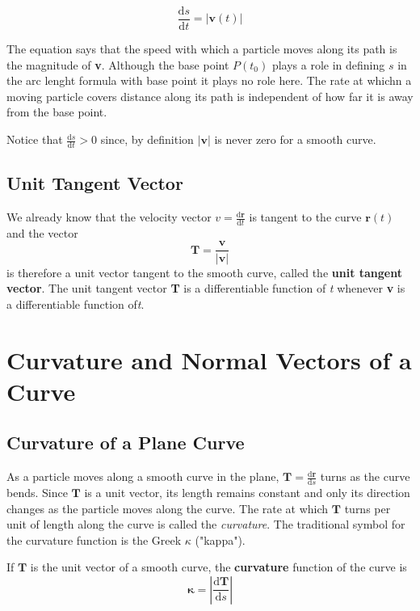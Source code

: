 \documentclass[12pt,a4paper]{article}
\newenvironment{definition}{\begin{definitionbox}}{\end{definitionbox}\vspace{1\baselineskip}}
\newenvironment{mynote}{\vspace{1\baselineskip}\begin{note}}{\end{note}\vspace{1\baselineskip}}
\begin{document}
\begin{mynote}
  \[\frac{\mathrm{d}s}{\mathrm{d}t} = |\mathbf{v}(t)|\]
\end{mynote}

The equation says that the speed with which a particle moves along its path is the magnitude of \textbf{v}. Although the base point $P(t_0)$ plays a role in defining \(s\) in the arc lenght formula with base point it plays no role here. 
The rate at whichn a moving particle covers distance along its path is independent of how far it is away from the base point.

Notice that \(\frac{\mathrm{d}s}{\mathrm{d}t} > 0\) since, by definition \(|\mathbf{v}|\) is never zero for a smooth curve.

\subsection{Unit Tangent Vector}

We already know that the velocity vector \(v = \frac{\mathrm{d}\mathbf{r}}{\mathrm{d}t}\) is tangent to the curve \(\mathbf{r}(t)\) and the vector
\[\mathbf{T} = \frac{\mathbf{v}}{|\mathbf{v}|}\]
is therefore a unit vector tangent to the smooth curve, called the \textbf{unit tangent vector}. The unit tangent vector \textbf{T} is a differentiable function of \textit{t} whenever \textbf{v} is a differentiable function of\textit{t}. 

\newpage

\section{Curvature and Normal Vectors of a Curve}
\subsection{Curvature of a Plane Curve}

As a particle moves along a smooth curve in the plane, $\mathbf{T} = \frac{\mathrm{d}\mathbf{r}}{\mathrm{d}s}$ turns as the curve bends. Since $\mathbf{T}$ is a unit vector, its length remains constant and only its direction changes as the particle moves along the curve. The rate at which $\mathbf{T}$ turns per unit of length along the curve is called the \textit{curvature}. The traditional symbol for the curvature function is the Greek $\kappa$ ("kappa").

\begin{definition}
  If $\mathbf{T}$ is the unit vector of a smooth curve, the \textbf{curvature} function of the curve is
  \[\mathbf{\kappa} = \left|\frac{\mathrm{d}\mathbf{T}}{\mathrm{d}s}\right|\]

\end{definition}
\end{document}
